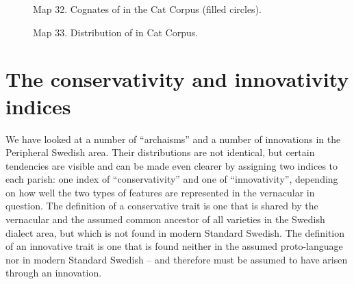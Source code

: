 \begin{figure}[h]

\begin{minipage}{6.28125in}

Map  32. Cognates of \textstyleLinguisticExample{ }in the Cat Corpus (filled circles).


\end{minipage}

\end{figure}

\begin{figure}[h]

\begin{minipage}{3.92847in}

Map 33. Distribution of  in Cat Corpus.


\end{minipage}

\end{figure}

\section{The conservativity and innovativity indices}

We have looked at a number of “archaisms” and a number of innovations in the Peripheral Swedish area. Their distributions are not identical, but certain tendencies are visible and can be made even clearer by assigning two indices to each parish: one index of “conservativity” and one of “innovativity”, depending on how well the two types of features are represented in the vernacular in question. The definition of a conservative trait is one that is shared by the vernacular and the assumed common ancestor of all varieties in the Swedish dialect area, but which is not found in modern Standard Swedish. The definition of an innovative trait is one that is found neither in the assumed proto-language nor in modern Standard Swedish – and therefore must be assumed to have arisen through an innovation. 


